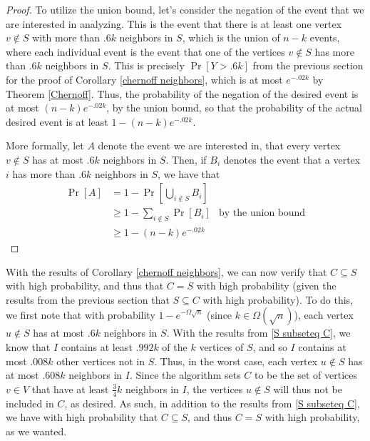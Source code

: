 \documentclass{article}
\begin{document}
\begin{proof}
    To utilize the union bound, let's consider the negation of the event that
    we are interested in analyzing. This is the event that there is at least
    one vertex $v \notin S$ with more than $.6k$ neighbors in $S$, which is the
    union of $n - k$ events, where each individual event is the event that one
    of the vertices $v \notin S$ has more than $.6k$ neighbors in $S$. This is
    precisely $\Pr[Y > .6k]$ from the previous section for the proof of
    Corollary \ref{chernoff neighbors}, which is at most $e^{-.02k}$ by Theorem
    \ref{Chernoff}. Thus, the probability of the negation of the desired event is at
    most $(n - k) e^{-.02k}$, by the union bound, so that the probability of the actual desired
    event is at least $1 - (n - k) e^{-.02k}$.

    More formally, let $A$ denote the event we are interested in, that every
    vertex $v \notin S$ has at most $.6k$ neighbors in $S$. Then, if $B_{i}$
    denotes the event that a vertex $i$ has more than $.6k$ neighbors
    in $S$, we have that
    \begin{align*}
        \Pr[A] &= 1 - \Pr\left[\bigcup_{i \notin S} B_{i}\right]
        \\
        &\geq 1 - \sum_{i \notin S} \Pr[B_{i}] & \text{by the union bound}
        \\
        &\geq 1 - (n - k) e^{-.02k}
    \end{align*}
\end{proof}

With the results of Corollary \ref{chernoff neighbors}, we can now verify that
$C \subseteq S$ with high probability, and thus that $C = S$ with high
probability (given the results from the previous section that $S \subseteq C$
with high probability). To do this, we first note that with probability $1 -
e^{-\Omega{\sqrt{n}}}$ (since $k \in \Omega(\sqrt{n})$), each
vertex $u \notin S$ has at most $.6k$ neighbors in $S$. With the results from
\ref{S subseteq C}, we know that $I$ contains at least $.992k$ of the $k$
vertices of $S$, and so $I$ contains at most $.008k$ other vertices not in $S$.
Thus, in the worst case, each vertex $u \notin S$ has at most $.608k$ neighbors
in $I$.
Since the algorithm
sets $C$ to be the set of vertices $v \in V$ that have at least $\frac{3}{4} k$
neighbors in $I$, the vertices $u \notin S$ will thus not be included in $C$,
as desired. As such, in addition to the results from \ref{S subseteq C}, we have
with high probability that $C \subseteq S$, and thus $C =
S$ with high probability, as we wanted.
\end{document}
